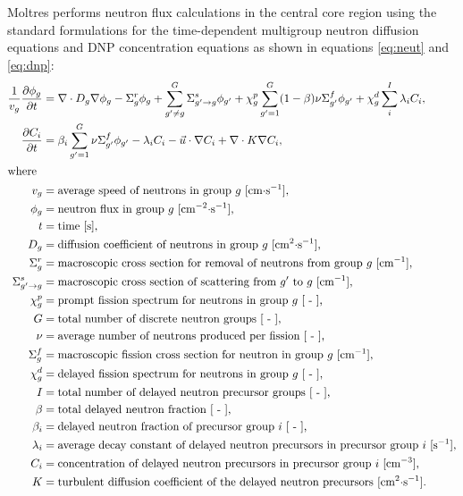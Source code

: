 Moltres performs neutron flux calculations in the central core region
using the standard formulations for the time-dependent multigroup
neutron diffusion equations and \gls{DNP} concentration equations as shown in
equations \ref{eq:neut} and \ref{eq:dnp}:
%
\begin{align}
    \frac{1}{v_g} \frac{\partial \phi_g}{\partial t} &= \nabla \cdot D_g
    \nabla \phi_g - \Sigma^r_g \phi_g +
    \sum^G_{g' \neq g} \Sigma^s_{g' \rightarrow g} \phi_{g'} + \chi^p_g
    \sum^G_{g'=1} (1-\beta) \nu \Sigma^f_{g'} \phi_{g'} + \chi^d_g \sum^I_i
    \lambda_i C_i, \label{eq:neut} \\
    \frac{\partial C_i}{\partial t} &= \beta_i \sum^G_{g'=1} \nu \Sigma^f_{g'}
    \phi_{g'} - \lambda_i C_i - \vec{u} \cdot \nabla C_i + \nabla \cdot
    K \nabla C_i, \label{eq:dnp} \\
    \intertext{where}
    v_g &= \text{average speed of neutrons in group $g$ [cm$\cdot$s$^{-1}$],} 
    \nonumber \\
    \phi_g &= \text{neutron flux in group $g$ [cm$^{-2}\cdot$s$^{-1}$],}
    \nonumber \\
    t &= \text{time [s],} \nonumber \\
    D_g &= \text{diffusion coefficient of neutrons in group $g$
    [cm$^2\cdot$s$^{-1}$],} \nonumber \\
    \Sigma^r_g &= \text{macroscopic cross section for removal of neutrons from
    group $g$ [cm$^{-1}$],} \nonumber \\
    \Sigma^s_{g' \rightarrow g} &= \text{macroscopic cross section of
    scattering from $g'$ to $g$ [cm$^{-1}$],} \nonumber \\
    \chi^p_g &= \text{prompt fission spectrum for neutrons in group $g$ [ - ],
    } \nonumber \\
    G &= \text{total number of discrete neutron groups [ - ],} \nonumber \\
    \nu &= \text{average number of neutrons produced per fission [ - ],}
    \nonumber \\
    \Sigma^f_{g} &= \text{macroscopic fission cross section for neutron in
    group $g$ [cm$^{-1}$],} \nonumber \\
    \chi^d_g &= \text{delayed fission spectrum for neutrons in group $g$
    [ - ],} \nonumber \\
    I &= \text{total number of delayed neutron precursor groups [ - ],}
    \nonumber \\
    \beta &= \text{total delayed neutron fraction [ - ],} \nonumber \\
    \beta_i &= \text{delayed neutron fraction of precursor group $i$ [ - ],}
    \nonumber \\
    \lambda_i &= \text{average decay constant of delayed neutron precursors in
    precursor group $i$ [s$^{-1}$],} \nonumber \\
    C_i &= \text{concentration of delayed neutron precursors in precursor
    group $i$ [cm$^{-3}$],} \nonumber \\
    K &= \text{turbulent diffusion coefficient of the delayed neutron
    precursors [cm$^2\cdot$s$^{-1}$].} \nonumber
\end{align}
%

